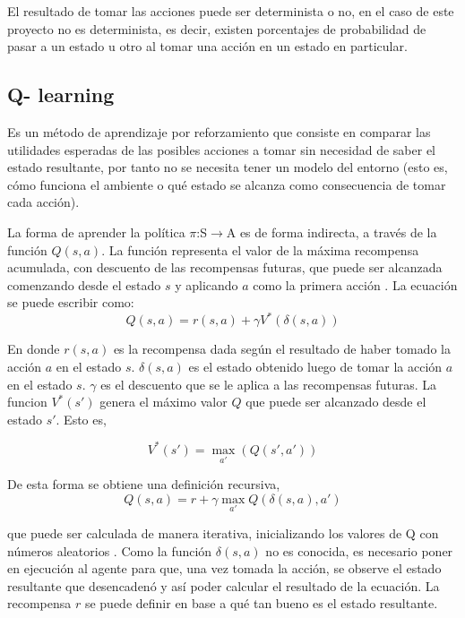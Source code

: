 El resultado de tomar las acciones puede ser determinista o no, en el caso de este proyecto no es determinista, es decir, existen porcentajes de probabilidad de pasar a un estado u otro al tomar una acción en un estado en particular.
  
\subsection{Q- learning}\label{subsec:Qlearning}

Es un método de aprendizaje por reforzamiento que consiste en comparar las utilidades esperadas de las posibles acciones a tomar sin necesidad de saber el estado resultante, por tanto no se necesita tener un modelo del entorno \cite{peterNorvig} (esto es, cómo funciona el ambiente o qu\'e estado se alcanza como consecuencia de tomar cada acción).

La forma de aprender la política $\pi$:S$\to$A es de forma indirecta, a través de la función $Q(s,a)$. La función representa el valor de la máxima recompensa acumulada, con descuento de las recompensas futuras, que puede ser alcanzada comenzando desde el estado $s$ y aplicando $a$ como la primera acción \cite{Mitchell}. La ecuación se puede escribir como:
\begin{equation}
Q(s,a) = r(s,a) + {\gamma V^*(\delta(s,a))}
\end{equation}


En donde $r(s,a)$ es la recompensa dada según el resultado de haber tomado la acción $a$ en el estado $s$. $\delta(s,a)$ es el estado obtenido luego de tomar la acción $a$ en el estado $s$. $\gamma$ es el descuento que se le aplica a las recompensas futuras. La funcion $V^*(s')$ genera el máximo valor $Q$ que puede ser alcanzado desde el estado $s'$. Esto es,

\begin{equation}
V^*(s') = \max_{a'} (Q(s',a'))
\end{equation}



De esta forma se obtiene una definición recursiva,
\begin{equation}
Q(s,a) = r + \gamma \max_{a'} Q(\delta(s,a) , a')  
\end{equation}

\noindent
que puede ser calculada de manera iterativa, inicializando los valores de Q con números aleatorios \cite{Mitchell}. Como la función $\delta(s,a)$ no es conocida, es necesario poner en ejecución al agente para que, una vez tomada la acción, se observe el estado resultante que desencadenó y así poder calcular el resultado de la ecuación. La recompensa $r$ se puede definir en base  a qu\'e tan bueno es el estado resultante. 



